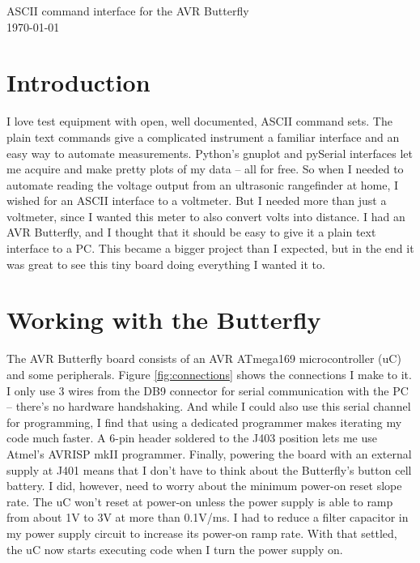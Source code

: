 
\graphicspath{
              {figs/} %
              {pngs/} %
}

\newcommand{\isdraft}{1} %
\doublespacing{} %






\begin{center}
	{\huge ASCII command interface for the AVR Butterfly}\\
	\today
\end{center}



\section{Introduction}
I love test equipment with open, well documented, ASCII command sets.  The plain text commands give a complicated instrument a familiar interface and an easy way to automate measurements.  Python's gnuplot and pySerial interfaces let me acquire and make pretty plots of my data -- all for free\cite{pyserial,gnuplot-py}. So when I needed to automate reading the voltage output from an ultrasonic rangefinder at home, I wished for an ASCII interface to a voltmeter.  But I needed more than just a voltmeter, since I wanted this meter to also convert volts into distance.  I had an AVR Butterfly, and I thought that it should be easy to give it a plain text interface to a PC.  This became a bigger project than I expected, but in the end it was great to see this tiny board doing everything I wanted it to.

\clearpage
\section{Working with the Butterfly}
The AVR Butterfly board consists of an AVR ATmega169 microcontroller (uC) and some peripherals.  Figure \ref{fig:connections} shows the connections I make to it.  I only use 3 wires from the DB9 connector for serial communication with the PC -- there's no hardware handshaking.  And while I could also use this serial channel for programming, I find that using a dedicated programmer makes iterating my code much faster.  A 6-pin header soldered to the J403 position lets me use Atmel's AVRISP mkII programmer.  Finally, powering the board with an external supply at J401 means that I don't have to think about the Butterfly's button cell battery.  I did, however, need to worry about the minimum power-on reset slope rate.  The uC won't reset at power-on unless the power supply is able to ramp from about 1V to 3V at more than 0.1V/ms.  I had to reduce a filter capacitor in my power supply circuit to increase its power-on ramp rate.  With that settled, the uC now starts executing code when I turn the power supply on.

